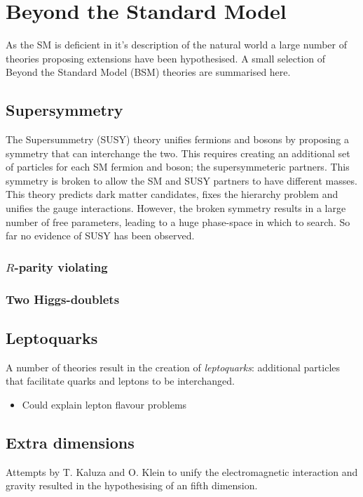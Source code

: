 \section{Beyond the Standard Model}
\label{sec:intro_BSM}
As the SM is deficient in it's description of the natural world a large number of theories proposing extensions have been hypothesised.
A small selection of Beyond the Standard Model (BSM) theories are summarised here. 

\subsection{Supersymmetry}

The Supersummetry (SUSY) theory unifies fermions and bosons by proposing a symmetry that can interchange the two. This requires creating an additional set of particles for each SM fermion and boson; the supersymmeteric partners. This symmetry is broken to allow the SM and SUSY partners to have different masses. This theory predicts dark matter candidates, fixes the hierarchy problem and unifies the gauge interactions. 
However, the broken symmetry results in a large number of free parameters, leading to a huge phase-space in which to search. So far no evidence of SUSY has been observed.

\subsubsection{$R$-parity violating}

\subsubsection{Two Higgs-doublets}


\subsection{Leptoquarks}

A number of theories result in the creation of \emph{leptoquarks}: additional particles that facilitate quarks and leptons to be interchanged. 

{\color{Red}
\begin{itemize}
\item Could explain lepton flavour problems
\end{itemize}}

\subsection{Extra dimensions}
Attempts by T. Kaluza and O. Klein to unify the electromagnetic interaction and gravity resulted in the hypothesising of an fifth dimension.




